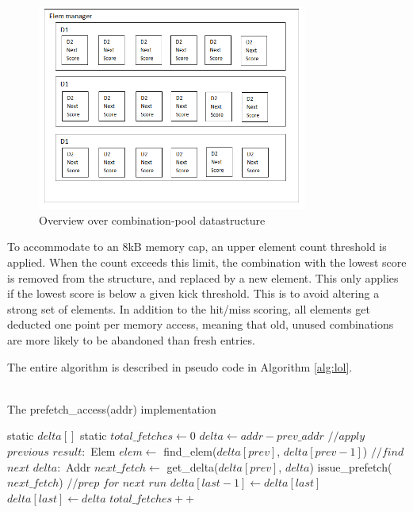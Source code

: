 \begin{figure}[h!]
	\includegraphics[width=3.5in]{table3}
	\caption{Overview over combination-pool datastructure}
	\label{graph:combpool}
\end{figure}



To accommodate to an 8kB memory cap, an upper element count threshold is applied. When the count exceeds this limit, the combination with the lowest score is removed from the structure, and replaced by a new element. This only applies if the lowest score is below a given kick threshold. This is to avoid altering a strong set of elements. In addition to the hit/miss scoring, all elements get deducted one point per memory access, meaning that old, unused combinations are more likely to be abandoned than fresh entries.

The entire algorithm is described in pseudo code in Algorithm \ref{alg:lol}. \\\\
\begin{algorithm}
\caption{The prefetch\_access(addr) implementation}
\label{alg:lol}
\begin{algorithmic}
\STATE static $delta[]$
\STATE static $total\_fetches \gets 0$
\STATE $delta \gets addr - prev\_addr$
\STATE
\STATE $//apply$ $previous$ $result:$
\STATE Elem $elem \gets$ find\_elem($delta[prev]$, $delta[prev - 1]$)
\ENDIF
{}
\ELSE
{}
\ENDIF
\ELSE
{}
\ELSE
{}
\ENDIF
\ENDIF
\STATE
\STATE $//find$ $next$ $delta:$
\STATE Addr $next\_fetch \gets$ get\_delta($delta[prev]$, $delta$)
\STATE issue\_prefetch($next\_fetch$)
\ENDIF
\STATE
\STATE $//prep$ $for$ $next$ $run$
\STATE $delta[last - 1] \gets delta[last]$
\STATE $delta[last] \gets delta$
\STATE $total\_fetches++$
\end{algorithmic}
\end{algorithm}



